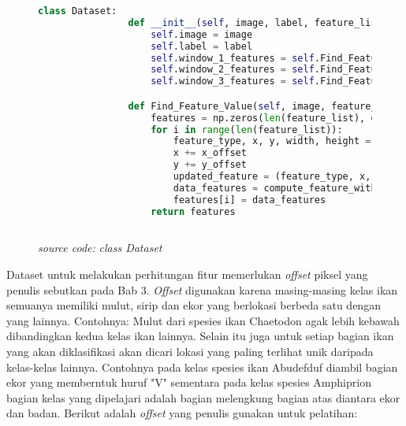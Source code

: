 	\begin{figure}[H]
		\begin{lstlisting}[language=Python, basicstyle=\tiny]
			class Dataset:
				def __init__(self, image, label, feature_list):
					self.image = image
					self.label = label
					self.window_1_features = self.Find_Feature_Value(image, feature_list, self.class_Window_offset_1[label][0], self.class_Window_offset_1[label][1])
					self.window_2_features = self.Find_Feature_Value(image, feature_list, self.class_Window_offset_2[label][0], self.class_Window_offset_2[label][1])
					self.window_3_features = self.Find_Feature_Value(image, feature_list, self.class_Window_offset_3[label][0], self.class_Window_offset_3[label][1])

				def Find_Feature_Value(self, image, feature_list, x_offset, y_offset):
					features = np.zeros(len(feature_list), dtype=object)
					for i in range(len(feature_list)):
						feature_type, x, y, width, height = feature_list[i]
						x += x_offset
						y += y_offset
						updated_feature = (feature_type, x, y, width, height)
						data_features = compute_feature_with_matrix(image, 0, updated_feature)
						features[i] = data_features
					return features
				
		\end{lstlisting}
		\caption{\emph{source code:} \textit{class Dataset}}
		\label{code:Dataset class}
	\end{figure}

	Dataset untuk melakukan perhitungan fitur memerlukan \textit{offset} piksel yang penulis 
	sebutkan pada Bab 3. \textit{Offset} digunakan karena masing-masing kelas ikan semuanya memiliki 
	mulut, sirip dan ekor yang berlokasi berbeda satu dengan yang lainnya. Contohnya: Mulut dari spesies ikan Chaetodon 
	agak lebih kebawah dibandingkan kedua kelas ikan lainnya. Selain itu juga untuk setiap bagian 
	ikan yang akan diklasifikasi akan dicari lokasi yang paling terlihat unik daripada kelas-kelas lainnya. Contohnya 
	pada kelas spesies ikan Abudefduf diambil bagian ekor yang memberntuk huruf "V" 
	sementara pada kelas spesies Amphiprion bagian kelas yang dipelajari adalah 
	bagian melengkung bagian atas diantara ekor dan badan. Berikut adalah \textit{offset} yang penulis gunakan 
	untuk pelatihan:

